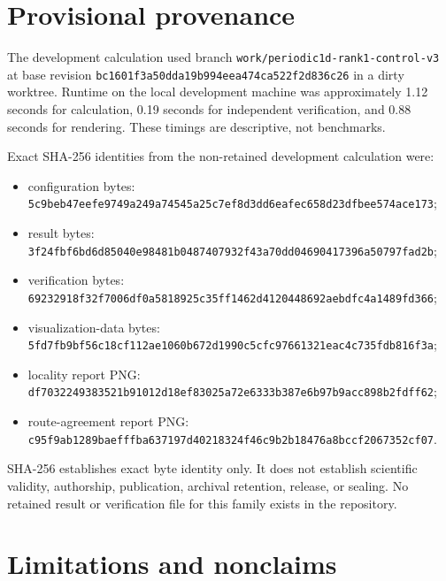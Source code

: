 \documentclass[11pt]{article}
\begin{document}
\section{Provisional provenance}

The development calculation used branch
\nolinkurl{work/periodic1d-rank1-control-v3} at base revision
\nolinkurl{bc1601f3a50dda19b994eea474ca522f2d836c26} in a dirty worktree.  Runtime on the
local development machine was approximately 1.12 seconds for calculation, 0.19 seconds
for independent verification, and 0.88 seconds for rendering.  These timings are
descriptive, not benchmarks.

Exact SHA-256 identities from the non-retained development calculation were:
\begin{itemize}
\item configuration bytes: \nolinkurl{5c9beb47eefe9749a249a74545a25c7ef8d3dd6eafec658d23dfbee574ace173};
\item result bytes: \nolinkurl{3f24fbf6bd6d85040e98481b0487407932f43a70dd04690417396a50797fad2b};
\item verification bytes: \nolinkurl{69232918f32f7006df0a5818925c35ff1462d4120448692aebdfc4a1489fd366};
\item visualization-data bytes: \nolinkurl{5fd7fb9bf56c18cf112ae1060b672d1990c5cfc97661321eac4c735fdb816f3a};
\item locality report PNG: \nolinkurl{df7032249383521b91012d18ef83025a72e6333b387e6b97b9acc898b2fdff62};
\item route-agreement report PNG: \nolinkurl{c95f9ab1289baefffba637197d40218324f46c9b2b18476a8bccf2067352cf07}.
\end{itemize}
SHA-256 establishes exact byte identity only.  It does not establish scientific
validity, authorship, publication, archival retention, release, or sealing.  No retained
result or verification file for this family exists in the repository.

\section{Limitations and nonclaims}
\end{document}
